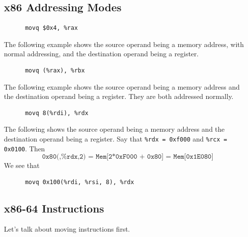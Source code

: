 \documentclass{article}
\begin{document}
\subsection{x86 Addressing Modes}

  \begin{example}
    \begin{lstlisting} 
      movq $0x4, %rax
    \end{lstlisting}
  \end{example}

  \begin{example}
    The following example shows the source operand being a memory address, with normal addressing, and the destination operand being a register.  
    \begin{lstlisting} 
      movq (%rax), %rbx
    \end{lstlisting}
  \end{example}

  \begin{example}
    The following example shows the source operand being a memory address and the destination operand being a register. They are both addressed normally. 
    \begin{lstlisting} 
      movq 8(%rdi), %rdx
    \end{lstlisting}
  \end{example}

  \begin{example}
    The following shows the source operand being a memory address and the destination operand being a register. Say that \texttt{\%rdx = 0xf000} and \texttt{\%rcx = 0x0100}. Then 
    \begin{equation}
      \texttt{0x80(,\%rdx,2) = Mem[2*0xF000 + 0x80] = Mem[0x1E080]}
    \end{equation}
    We see that 
    \begin{lstlisting} 
      movq 0x100(%rdi, %rsi, 8), %rdx
    \end{lstlisting}
  \end{example}

\subsection{x86-64 Instructions}

  Let's talk about moving instructions first. 
\end{document}
